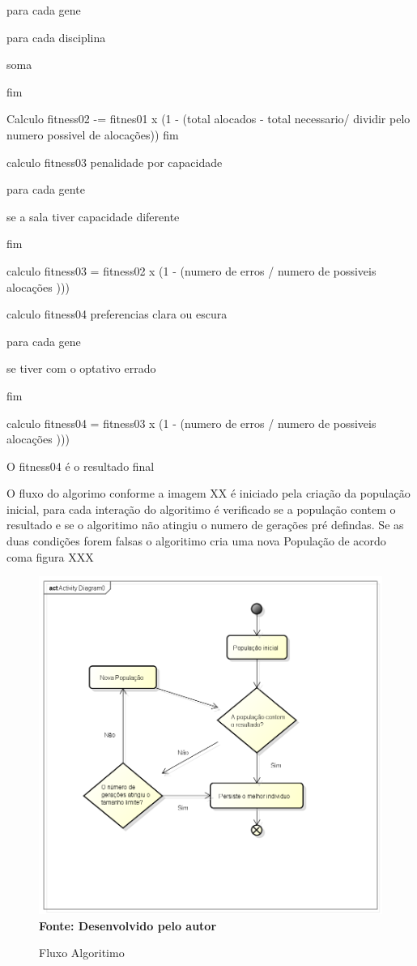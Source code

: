 \documentclass{abntpuc}
\begin{document}
para cada gene 

para cada disciplina 

soma

fim

Calculo fitness02 -= fitnes01 x (1 - (total alocados - total necessario/ dividir pelo numero possivel de alocações))
fim

calculo fitness03 penalidade por capacidade

para cada gente

se a sala tiver capacidade diferente

fim

calculo fitness03 = fitness02 x (1 - (numero de erros /  numero de possiveis alocações )))


calculo fitness04 preferencias clara ou escura

para cada gene 

se tiver com o optativo errado 

fim	

calculo fitness04 = fitness03 x (1 - (numero de erros /  numero de possiveis alocações )))


O fitness04 é o resultado final


O fluxo do algorimo conforme a imagem XX é iniciado pela criação da população inicial, para cada interação do algoritimo é verificado se a população contem o resultado e se o algoritimo não atingiu o numero de gerações pré defindas. Se as duas condições forem falsas o algoritimo cria uma nova População de acordo coma figura XXX

\begin{figure}[!htb]
\caption[Fluxo Algoritimo]{Fluxo Algoritimo}
\label{fig:figura8}
\centering
\includegraphics[scale=0.7]{imagens/fluxoAlgoritimo.png}
\\ \textbf{\footnotesize Fonte: Desenvolvido pelo autor}
\end{figure}



%

%
\end{document}

